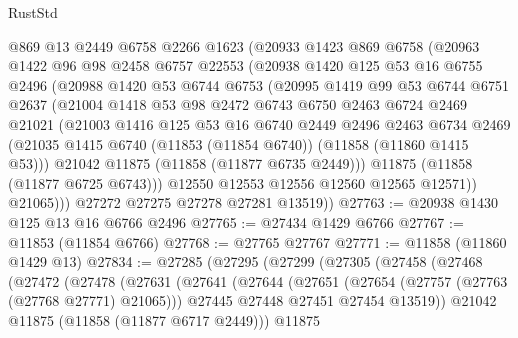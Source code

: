 \begin{lexlean}{RustStd}
\begin{coremodule}
        @869
        @13
        @2449
        @6758
        @2266
        @1623
        (@20933
          @1423
          @869
          @6758
          (@20963
            @1422
            @96
            @98
            @2458
            @6757
            @22553
            (@20938
              @1420
              @125
              @53
              @16
              @6755
              @2496
              (@20988
                @1420
                @53
                @6744
                @6753
                (@20995
                  @1419
                  @99
                  @53
                  @6744
                  @6751
                  @2637
                  (@21004
                    @1418
                    @53
                    @98
                    @2472
                    @6743
                    @6750
                    @2463
                    @6724
                    @2469
                    @21021
                    (@21003
                      @1416
                      @125
                      @53
                      @16
                      @6740
                      @2449
                      @2496
                      @2463
                      @6734
                      @2469
                      (@21035 @1415 @6740 (@11853 (@11854 @6740)) (@11858 (@11860 @1415 @53)))
                      @21042
                      @11875
                      (@11858 (@11877 @6735 @2449)))
                    @11875
                    (@11858 (@11877 @6725 @6743)))
                  @12550
                  @12553
                  @12556
                  @12560
                  @12565
                  @12571))
              @21065)))
        @27272
        @27275
        @27278
        @27281
        @13519))
@27763 := @20938 @1430 @125 @13 @16 @6766 @2496
@27765 := @27434 @1429 @6766
@27767 := @11853 (@11854 @6766)
@27768 := @27765 @27767
@27771 := @11858 (@11860 @1429 @13)
@27834 := @27285
    (@27295
      (@27299
        (@27305
          (@27458
            (@27468
              (@27472
                (@27478
                  (@27631
                    (@27641
                      (@27644
                        (@27651
                          (@27654 (@27757 (@27763 (@27768 @27771) @21065)))
                          @27445
                          @27448
                          @27451
                          @27454
                          @13519))
                      @21042
                      @11875
                      (@11858 (@11877 @6717 @2449)))
                    @11875

\end{coremodule}
\end{lexlean}
